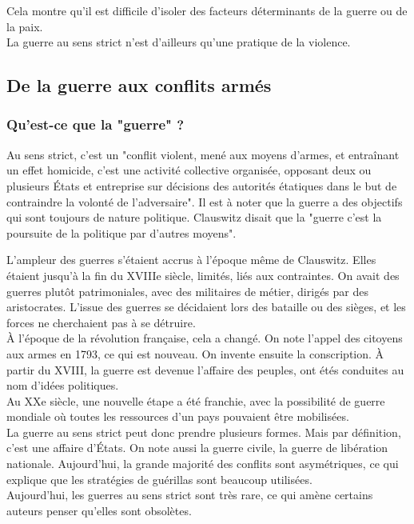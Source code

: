 \documentclass[10pt, a4paper, openany]{book}
\begin{document}
Cela montre qu'il est difficile d'isoler des facteurs déterminants de la guerre ou de la paix. \\
La guerre au sens strict n'est d'ailleurs qu'une pratique de la violence. 

\subsection{De la guerre aux conflits armés}

\subsubsection{Qu'est-ce que la "guerre" ?}

Au sens strict, c'est un "conflit violent, mené aux moyens d'armes, et entraînant un effet homicide, c'est une activité collective organisée, opposant deux ou plusieurs États et entreprise sur décisions des autorités étatiques dans le but de contraindre la volonté de l'adversaire". Il est à noter que la guerre a des objectifs qui sont toujours de nature politique. Clauswitz disait que la "guerre c'est la poursuite de la politique par d'autres moyens".


L'ampleur des guerres s'étaient accrus à l'époque même de Clauswitz. Elles étaient jusqu'à la fin du XVIIIe siècle, limités, liés aux contraintes. On avait des guerres plutôt patrimoniales, avec des militaires de métier, dirigés par des aristocrates. L'issue des guerres se décidaient lors des bataille ou des sièges, et les forces ne cherchaient pas à se détruire. \\
À l'époque de la révolution française, cela a changé. On note l'appel des citoyens aux armes en 1793, ce qui est nouveau. On invente ensuite la conscription. À partir du XVIII, la guerre est devenue l'affaire des peuples, ont étés conduites au nom d'idées politiques. \\
Au XXe siècle, une nouvelle étape a été franchie, avec la possibilité de guerre mondiale où toutes les ressources d'un pays pouvaient être mobilisées. \\
La guerre au sens strict peut donc prendre plusieurs formes. Mais par définition, c'est une affaire d'États. On note aussi la guerre civile, la guerre de libération nationale. Aujourd'hui, la grande majorité des conflits sont asymétriques, ce qui explique que les stratégies de guérillas sont beaucoup utilisées. \\
Aujourd'hui, les guerres au sens strict sont très rare, ce qui amène certains auteurs penser qu'elles sont obsolètes. 
\end{document}
